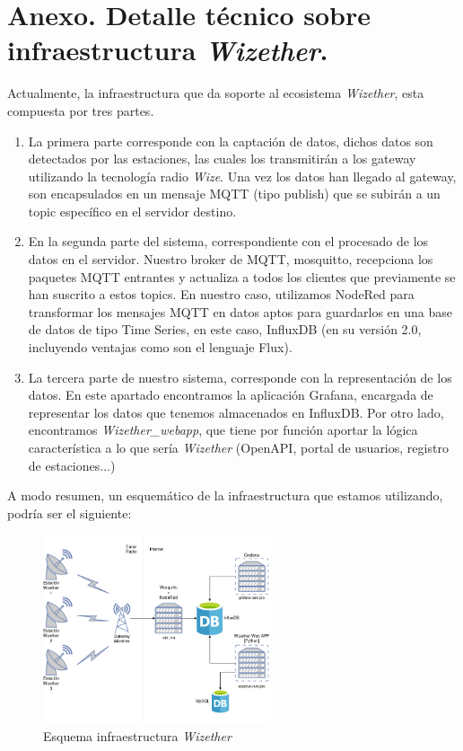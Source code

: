 \documentclass[12pt]{article}
\begin{document}

\pagebreak

\section{Anexo. Detalle técnico sobre infraestructura \textit{Wizether}.}

\noindent Actualmente, la infraestructura que da soporte al ecosistema \textit{Wizether}, esta compuesta por tres partes. 

\begin{enumerate}
	\item La primera parte corresponde con la captación de datos, dichos datos son detectados por las estaciones, las cuales los transmitirán a los gateway utilizando la tecnología radio \textit{Wize}. Una vez los datos han llegado al gateway, son encapsulados en un mensaje MQTT (tipo publish) que se subirán a un topic específico en el servidor destino.
	
	\item En la segunda parte del sistema, correspondiente con el procesado de los datos en el servidor. Nuestro broker de MQTT, mosquitto, recepciona los paquetes MQTT entrantes y actualiza a todos los clientes que previamente se han suscrito a estos topics. En nuestro caso, utilizamos NodeRed para transformar los mensajes MQTT en datos aptos para guardarlos en una base de datos de tipo Time Series, en este caso, InfluxDB (en su versión 2.0, incluyendo ventajas como son el lenguaje Flux).
	
	\item La tercera parte de nuestro sistema, corresponde con la representación de los datos. En este apartado encontramos la aplicación Grafana, encargada de representar los datos que tenemos almacenados en InfluxDB. Por otro lado, encontramos \textit{Wizether\_webapp}, que tiene por función aportar la lógica característica a lo que sería \textit{Wizether} (OpenAPI, portal de usuarios, registro de estaciones...)
\end{enumerate}

\noindent A modo resumen, un esquemático de la infraestructura que estamos utilizando, podría ser el siguiente:

\begin{figure}[h]
	\begin{center}
		\includegraphics[width=0.6\textwidth]{img_rani/WizeTher_infraestructura.png}
		\caption{Esquema infraestructura \textit{Wizether}}
	\end{center}
\end{figure}
\end{document}
